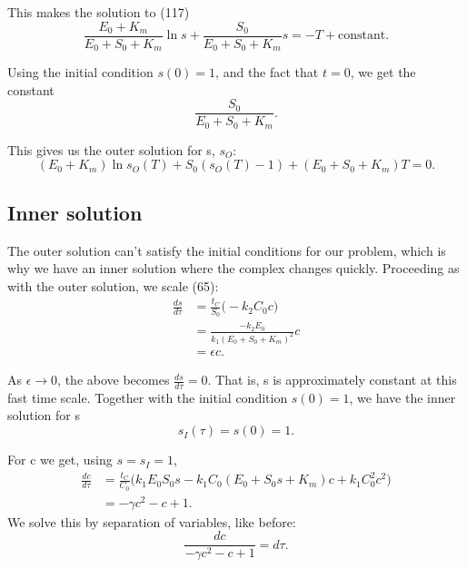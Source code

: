 \documentclass[12pt]{article}
\begin{document}
This makes the solution to (117)
\begin{equation}
\frac{E_0+K_m}{E_0 + S_0 + K_m} \ln{s} + \frac{S_0}{E_0 + S_0 + K_m} s = - T + \text{constant}.
\end{equation}

Using the initial condition $s(0)=1$, and the fact that $t=0$, we get
the constant
\begin{equation}
  \frac{S_0}{E_0 + S_0 + K_m}.
\end{equation}

This gives us the outer solution for s, $s_O$:
\begin{equation}
  (E_0+K_m) \ln{s_O(T)} + S_0 (s_O(T) - 1) + (E_0 + S_0 + K_m) T = 0.
\end{equation}

\subsection{Inner solution}

The outer solution can't satisfy the initial conditions for our
problem, which is why we have an inner solution where the complex
changes quickly. Proceeding as with the outer solution, we scale (65):
\begin{align}
\frac{ds}{d\tau} &= \frac{t_C}{S_0} \Big( - k_2 C_0 c \Big) \\
                 &= \frac{-k_2 E_0}{k_1(E_0 + S_0 + K_m)^2} c \\
                 &= \epsilon c.
\end{align}

As $\epsilon \to 0$, the above becomes $\frac{ds}{d\tau} = 0$. That
is, s is approximately constant at this fast time scale. Together with
the initial condition $s(0)=1$, we have the inner solution for s
\begin{equation}
s_I(\tau) = s(0) = 1.
\end{equation}

For c we get, using $s= s_I = 1$,
\begin{align}
\frac{dc}{d\tau} &= \frac{t_C}{C_0} \Big(
                     k_1 E_0 S_0 s - k_1 C_0 (E_0 + S_0 s + K_m) c + k_1 C_0^2 c^2
                     \Big) \\
                 & = - \gamma c^2 - c + 1.
\end{align}
We solve this by separation of variables, like before:
\begin{equation}
\frac{dc}{- \gamma c^2 - c + 1} = d\tau.
\end{equation}
\end{document}
